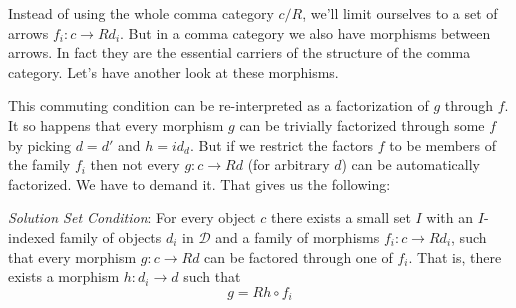 \documentclass[11pt]{amsart}
\begin{document}
Instead of using the whole comma category $c/R$, we'll limit ourselves to a set of arrows $f_i \colon c \to R d_i$. But in a comma category we also have morphisms between arrows. In fact they are the essential carriers of the structure of the comma category. Let's have another look at these morphisms.

\begin{figure}[H]
\centering
\end{figure}

This commuting condition can be re-interpreted as a factorization of $g$ through $f$. It so happens that every morphism $g$ can be trivially factorized through some $f$ by  picking $d = d'$ and $h = id_d$. But if we restrict the factors $f$ to be members of the family $f_i$ then not every $g \colon c \to R d$  (for arbitrary $d$) can be automatically factorized. We have to demand it. That gives us the following:

\emph{Solution Set Condition}: For every object $c$ there exists a small set $I$ with an $I$-indexed family of objects $d_i$ in $\mathcal D$ and a family of morphisms $f_i \colon c \to R d_i$, such that every morphism $g \colon c \to R d$ can be factored through one of $f_i$. That is, there exists a morphism $h \colon d_i \to d$ such that
\[g = R h \circ f_i \]
\end{document}
